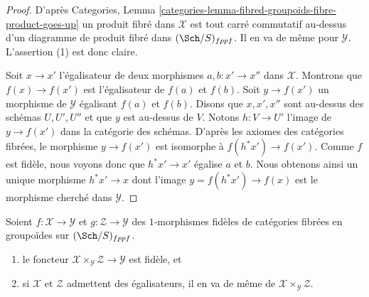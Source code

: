 \begin{proof}
D'après
Categories, Lemma \ref{categories-lemma-fibred-groupoids-fibre-product-goes-up}
un produit fibré dans $\mathcal{X}$ est tout carré commutatif au-dessus
d'un diagramme de produit fibré dans $(\Sch/S)_{fppf}$. Il en va de même pour
$\mathcal{Y}$. L'assertion (1) est donc claire.

\medskip\noindent
Soit $x \to x'$ l'égalisateur de deux morphismes $a, b : x' \to x''$
dans $\mathcal{X}$. Montrons que $f(x) \to f(x')$ est l'égalisateur
de $f(a)$ et $f(b)$. Soit $y \to f(x')$ un morphisme de $\mathcal{Y}$
égalisant $f(a)$ et $f(b)$. Disons que $x, x', x''$ sont au-dessus des schémas
$U, U', U''$ et que $y$ est au-dessus de $V$. Notons $h : V \to U'$ l'image
de $y \to f(x')$ dans la catégorie des schémas. D'après les axiomes des catégories
fibrées, le morphisme $y \to f(x')$ est isomorphe à $f(h^*x') \to f(x')$.
Comme $f$ est fidèle, nous voyons donc que
$h^*x' \to x'$ égalise $a$ et $b$. Nous obtenons ainsi un unique morphisme
$h^*x' \to x$ dont l'image $y = f(h^*x') \to f(x)$ est le morphisme cherché
dans $\mathcal{Y}$.
\end{proof}

\begin{lemma}
\label{lemma-fibre-products-preserve-properties}
Soient $f : \mathcal{X} \to \mathcal{Y}$ et $g : \mathcal{Z} \to \mathcal{Y}$
des $1$-morphismes fidèles de catégories
fibrées en groupoïdes sur $(\Sch/S)_{fppf}$.
\begin{enumerate}
\item le foncteur $\mathcal{X} \times_\mathcal{Y} \mathcal{Z} \to \mathcal{Y}$
est fidèle, et
\item si $\mathcal{X}$ et $\mathcal{Z}$ admettent des égalisateurs, il en va de même de
$\mathcal{X} \times_\mathcal{Y} \mathcal{Z}$.
\end{enumerate}
\end{lemma}

